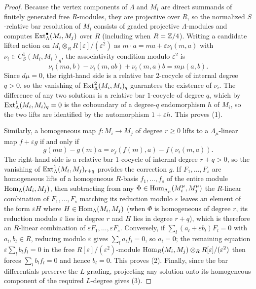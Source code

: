 \begin{proof}
Because the vertex components of $\Lambda$ and $M_i$ are direct summands of
finitely generated free $R$-modules, they are projective over $R$, so the
normalized $S$-relative bar resolution of $M_i$ consists of graded projective
$\Lambda$-modules and computes $\operatorname{Ext}^\bullet_\Lambda(M_i,M_j)$ over $R$ (including
when $R=\mathbb Z/4$). Writing a candidate lifted action on
$M_i\otimes_R R[\varepsilon]/(\varepsilon^2)$ as
$m\cdot a=ma+\varepsilon\nu_i(m,a)$ with $\nu_i\in C^1_S(M_i,M_i)_q$, the
associativity condition modulo $\varepsilon^2$ is
\[
 \nu_i(ma,b)-\nu_i(m,ab)+\nu_i(m,a)b=m\mu(a,b).
\]
Since $d\mu=0$, the right-hand side is a relative bar $2$-cocycle of internal
degree $q>0$, so the vanishing of $\operatorname{Ext}^2_\Lambda(M_i,M_i)_q$ guarantees the
existence of $\nu_i$. The difference of any two solutions is a relative bar
$1$-cocycle of degree $q$, which by $\operatorname{Ext}^1_\Lambda(M_i,M_i)_q=0$ is the
coboundary of a degree-$q$ endomorphism $h$ of $M_i$, so the two lifts are
identified by the automorphism $1+\varepsilon h$. This proves (1).

Similarly, a homogeneous map $f:M_i\to M_j$ of degree $r\geq0$ lifts to a
$\Lambda_\mu$-linear map $f+\varepsilon g$ if and only if
\[
 g(ma)-g(m)a=\nu_j(f(m),a)-f(\nu_i(m,a)).
\]
The right-hand side is a relative bar $1$-cocycle of internal degree
$r+q>0$, so the vanishing of $\operatorname{Ext}^1_\Lambda(M_i,M_j)_{r+q}$ provides the correction $g$.
If $F_1,\ldots,F_s$ are homogeneous lifts of a homogeneous $R$-basis
$f_1,\ldots,f_s$ of the entire module $\operatorname{Hom}_\Lambda(M_i,M_j)$, then
subtracting from any $\Phi\in\operatorname{Hom}_{\Lambda_\mu}(M_i^\mu,M_j^\mu)$ the $R$-linear
combination of $F_1,\ldots,F_s$ matching its reduction modulo $\varepsilon$
leaves an element of the form $\varepsilon H$ where $H\in\operatorname{Hom}_\Lambda(M_i,M_j)$
(when $\Phi$ is homogeneous of degree $r$, its reduction modulo $\varepsilon$
lies in degree $r$ and $H$ lies in degree $r+q$), which is therefore an
$R$-linear combination of $\varepsilon F_1,\ldots,\varepsilon F_s$. Conversely, if
$\sum_l(a_l+\varepsilon b_l)F_l=0$ with $a_l,b_l\in R$, reducing modulo
$\varepsilon$ gives $\sum_l a_l f_l=0$, so $a_l=0$; the remaining equation
$\varepsilon\sum_l b_l f_l=0$ in the free $R[\varepsilon]/(\varepsilon^2)$-module
$\operatorname{Hom}_R(M_i,M_j)\otimes_R R[\varepsilon]/(\varepsilon^2)$ then forces
$\sum_l b_l f_l=0$ and hence $b_l=0$. This proves (2). Finally, since the
bar differentials preserve the $L$-grading, projecting any solution onto its
homogeneous component of the required $L$-degree gives (3).
\end{proof}
